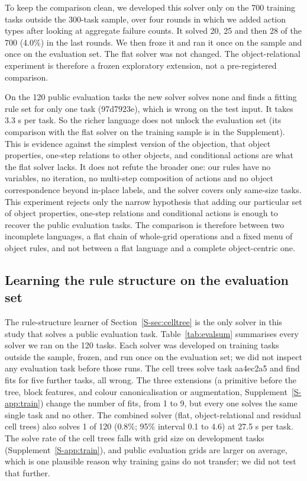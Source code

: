 \documentclass[sigconf,nonacm]{acmart}
\begin{document}
To keep the comparison clean, we developed this solver only on the 700 training tasks outside the 300-task sample, over four rounds in which we added action types after looking at aggregate failure counts. It solved 20, 25 and then 28 of the 700 (4.0\%) in the last rounds. We then froze it and ran it once on the sample and once on the evaluation set. The flat solver was not changed. The object-relational experiment is therefore a frozen exploratory extension, not a pre-registered comparison.



On the 120 public evaluation tasks the new solver solves none and finds a fitting rule set for only one task (97d7923e), which is wrong on the test input. It takes 3.3 s per task. So the richer language does not unlock the evaluation set (its comparison with the flat solver on the training sample is in the Supplement). This is evidence against the simplest version of the objection, that object properties, one-step relations to other objects, and conditional actions are what the flat solver lacks. It does not refute the broader one: our rules have no variables, no iteration, no multi-step composition of actions and no object correspondence beyond in-place labels, and the solver covers only same-size tasks. This experiment rejects only the narrow hypothesis that adding our particular set of object properties, one-step relations and conditional actions is enough to recover the public evaluation tasks. The comparison is therefore between two incomplete languages, a flat chain of whole-grid operations and a fixed menu of object rules, and not between a flat language and a complete object-centric one.


\subsection{Learning the rule structure on the evaluation set}
\label{sec:evalcell}

The rule-structure learner of Section~\ref{S-sec:celltree} is the only solver in this study that solves a public evaluation task. Table~\ref{tab:evalsum} summarises every solver we ran on the 120 tasks. Each solver was developed on training tasks outside the sample, frozen, and run once on the evaluation set; we did not inspect any evaluation task before those runs. The cell trees solve task aa4ec2a5 and find fits for five further tasks, all wrong. The three extensions (a primitive before the tree, block features, and colour canonicalisation or augmentation, Supplement~\ref{S-app:train}) change the number of fits, from 1 to 9, but every one solves the same single task and no other. The combined solver (flat, object-relational and residual cell trees) also solves 1 of 120 (0.8\%; 95\% interval 0.1 to 4.6) at 27.5 s per task. The solve rate of the cell trees falls with grid size on development tasks (Supplement~\ref{S-app:train}), and public evaluation grids are larger on average, which is one plausible reason why training gains do not transfer; we did not test that further.
\end{document}

